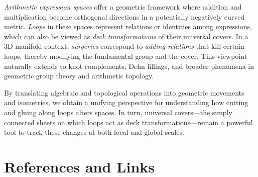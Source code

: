 \documentclass[11pt]{article}
\theoremstyle{remark}
\begin{document}
    \emph{Arithmetic expression spaces} offer a geometric framework where addition and multiplication become orthogonal directions in a potentially negatively curved metric. \emph{Loops} in these spaces represent relations or identities among expressions, which can also be viewed as \emph{deck transformations} of their universal covers. In a 3D manifold context, \emph{surgeries} correspond to \emph{adding relations} that kill certain loops, thereby modifying the fundamental group and the cover. This viewpoint naturally extends to knot complements, Dehn fillings, and broader phenomena in geometric group theory and arithmetic topology.

    \medskip

    By translating algebraic and topological operations into geometric movements and isometries, we obtain a unifying perspective for understanding how cutting and gluing along loops alters spaces. In turn, universal covers---the simply connected sheets on which loops act as deck transformations---remain a powerful tool to track these changes at both local and global scales.

    \bigskip

    \section*{References and Links}
\end{document}
